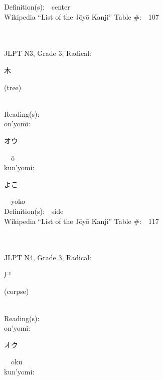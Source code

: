 \begin{multicols}{2}
Definition(s):\ \ center \\
Wikipedia ``List of the J\=oy\=o Kanji'' Table \#:\ \ 107 \\
\ \ \\
{\fontsize{34pt}{40pt}  }\ \ \\  %
{JLPT N3, Grade 3, Radical:\ \ {\begin{CJK}{UTF8}{min} 木 \end{CJK}} (tree) } \\
Reading(s):\ \ \\
{\hspace*{1em}}on'yomi:\ \ \\
{\hspace*{2em}}{\begin{CJK}{UTF8}{min} オウ \end{CJK}}\ \ \=o\ \ \\
{\hspace*{1em}}kun'yomi:\ \ \\
{\hspace*{2em}}{\begin{CJK}{UTF8}{min} よこ \end{CJK}}\ \ yoko\ \ \\
Definition(s):\ \ side \\
Wikipedia ``List of the J\=oy\=o Kanji'' Table \#:\ \ 117 \\
\ \ \\
{\fontsize{34pt}{40pt}  }\ \ \\  %
{JLPT N4, Grade 3, Radical:\ \ {\begin{CJK}{UTF8}{min} 尸 \end{CJK}} (corpse) } \\
Reading(s):\ \ \\
{\hspace*{1em}}on'yomi:\ \ \\
{\hspace*{2em}}{\begin{CJK}{UTF8}{min} オク \end{CJK}}\ \ oku\ \ \\
{\hspace*{1em}}kun'yomi:\ \ \\

\end{multicols}
